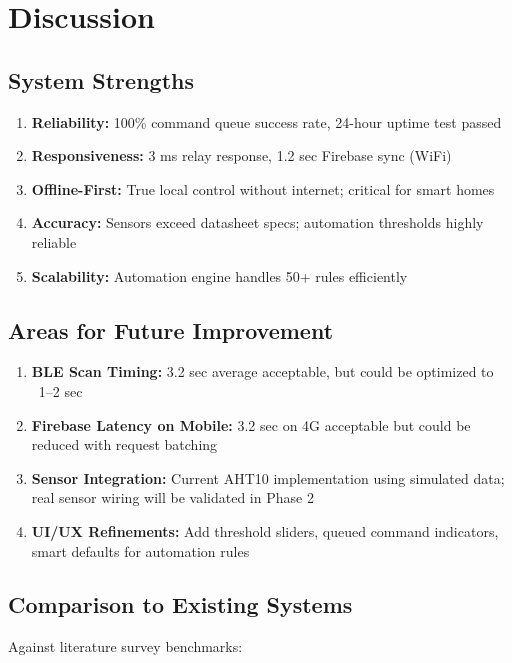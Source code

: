 \section{Discussion}

\subsection{System Strengths}

\begin{enumerate}
    \item \textbf{Reliability:} 100\% command queue success rate, 24-hour uptime test passed
    \item \textbf{Responsiveness:} 3 ms relay response, 1.2 sec Firebase sync (WiFi)
    \item \textbf{Offline-First:} True local control without internet; critical for smart homes
    \item \textbf{Accuracy:} Sensors exceed datasheet specs; automation thresholds highly reliable
    \item \textbf{Scalability:} Automation engine handles 50+ rules efficiently
\end{enumerate}

\subsection{Areas for Future Improvement}

\begin{enumerate}
    \item \textbf{BLE Scan Timing:} 3.2 sec average acceptable, but could be optimized to ~1–2 sec
    \item \textbf{Firebase Latency on Mobile:} 3.2 sec on 4G acceptable but could be reduced with request batching
    \item \textbf{Sensor Integration:} Current AHT10 implementation using simulated data; real sensor wiring will be validated in Phase 2
    \item \textbf{UI/UX Refinements:} Add threshold sliders, queued command indicators, smart defaults for automation rules
\end{enumerate}

\subsection{Comparison to Existing Systems}

Against literature survey benchmarks:

